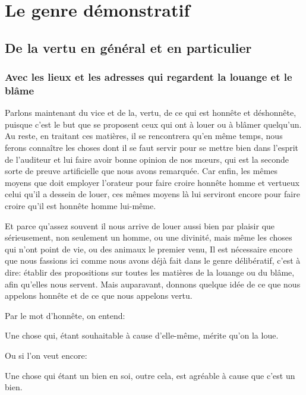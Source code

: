 
\chapter{Le genre démonstratif}
\section{De la vertu en général et en particulier}
\subsection{Avec les lieux et les adresses qui regardent la louange et le blâme}

Parlons maintenant du vice et de la, vertu, de ce qui est honnête et déshonnête, puisque c'est le but que se
proposent ceux qui ont à louer ou à blâmer quelqu'un. Au reste, en traitant ces matières, il se rencontrera
qu'en même temps, nous ferons connaître les choses dont il se faut servir pour se mettre bien dans l'esprit
de l'auditeur et lui faire avoir bonne opinion de nos mœurs, qui est la seconde sorte de preuve artificielle
que nous avons remarquée. Car enfin, les mêmes moyens que doit employer l'orateur pour faire croire honnête
homme et vertueux celui qu'il a dessein de louer, ces mêmes moyens là lui serviront encore pour faire croire
qu'il est honnête homme lui-même.

Et parce qu'assez souvent il nous arrive de louer aussi bien par plaisir que sérieusement, non seulement un
homme, ou une divinité, mais même les choses qui n'ont point de vie, ou des animaux le premier venu, Il est
nécessaire encore que nous fassions ici comme nous avons déjà fait dans le genre délibératif, c'est à dire:
établir des propositions sur toutes les matières de la louange ou du blâme, afin qu'elles nous servent. Mais
auparavant, donnons quelque idée de ce que nous appelons honnête et de ce que nous appelons vertu.

\bigbreak

Par le mot d'honnête, on entend:

\begin{emphpar}
	Une chose qui, étant souhaitable à cause d'elle-même, mérite qu'on la loue.
\end{emphpar}

Ou si l'on veut encore:

\begin{emphpar}
	Une chose qui étant un bien en soi, outre cela, est agréable à cause que c'est un bien.
\end{emphpar}

